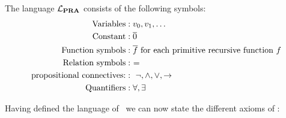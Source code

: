 \documentclass[../main.tex]{subfiles}
\begin{document}
\begin{defi}
	The language $\mathcal{L}_{\text{\textbf{PRA}}}$ consists of the following symbols:
	\begin{align*}
		\text{Variables}&: v_0,v_1,\ldots \\
		\text{Constant} &: \overline{0}\\
		\text{Function symbols} &: \overline f\ \text{for each primitive
		recursive function}\ f\\
			\text{Relation symbols} &:\ =\\
			\text{propositional connectives:} &:\
			\neg,\wedge,\vee,\rightarrow\\
			\text{Quantifiers} &: \forall,\exists
	\end{align*}
\end{defi}
Having defined the language of \PRA\ we can now state the different axioms of
\PRA:
\end{document}
